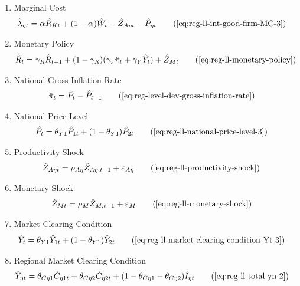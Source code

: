 \documentclass[../thesis.tex]{subfiles}
\begin{document}
{\begin{itemize}
\begin{enumerate}
		\item Marginal Cost
		\begin{alignat}{2}
			\hat{\lambda}_{\eta t} &= {\alpha_{}} \hat{R}_{Kt} + (1- {\alpha_{}}) \hat{W}_{t} - \hat{Z}_{A\eta t} - \hat{P}_{\eta t} \tag{\ref{eq:reg-ll-int-good-firm-MC-3}}
		\end{alignat}
		
		\item Monetary Policy
		\begin{align}
			& \hat{R}_t = \gamma_R \hat{R}_{t-1} + (1-\gamma_R)(\gamma_\pi \hat{\pi}_t + \gamma_Y \hat{Y}_t) + \hat{Z}_{Mt} \tag{\ref{eq:reg-ll-monetary-policy}}
		\end{align}
		
		\item National Gross Inflation Rate
		\begin{align}
			\hat{\pi}_{t} &= \hat{P}_{t} - \hat{P}_{t-1} \tag{\ref{eq:reg-level-dev-gross-inflation-rate}}
		\end{align}
		
		\item National Price Level
		\begin{alignat}{2}
			\hat{P}_{t} &= \theta_{Y1} \hat{P}_{1t} + (1-\theta_{Y1}) \hat{P}_{2t} \tag{\ref{eq:reg-ll-national-price-level-3}}
		\end{alignat}
		
		\item Productivity Shock
		\begin{alignat}{2}
			\hat{Z}_{A\eta t} &= \rho_{A\eta} \hat{Z}_{A\eta, t-1} + \varepsilon_{A\eta} \tag{\ref{eq:reg-ll-productivity-shock}}
		\end{alignat}
		
		\item Monetary Shock
		\begin{alignat}{2}
			\hat{Z}_{Mt} &= \rho_M \hat{Z}_{M,t-1} + \varepsilon_{M} \tag{\ref{eq:reg-ll-monetary-shock}}
		\end{alignat}
		
		\item Market Clearing Condition
		\begin{align}
			\hat{Y}_{t} &= \theta_{Y1} \hat{Y}_{1t} + (1-\theta_{Y1}) \hat{Y}_{2t} \tag{\ref{eq:reg-ll-market-clearing-condition-Yt-3}}
		\end{align}
		
		\item Regional Market Clearing Condition
		\begin{align}
			\hat{Y}_{\eta t} &= \theta_{C\eta 1} \hat{C}_{\eta 1 t} + \theta_{C\eta 2} \hat{C}_{\eta 2 t} + (1 - \theta_{C\eta 1} - \theta_{C\eta 2}) \hat{I}_{\eta t} \tag{\ref{eq:reg-ll-total-yn-2}}
		\end{align}
		
	\end{enumerate}
	
\end{itemize}

} %
\end{document}
